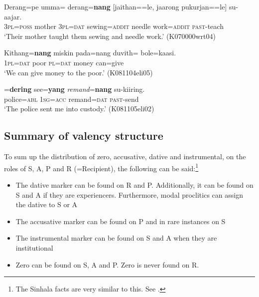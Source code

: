 \ea \label{ex:argstr:3:zzd:jaithan}
\gll Derang=pe umma=\zero{}   derang=\textbf{nang}  [jaithan=\zero=le,  jaarong  pukurjan=\zero=le]      su-aajar. \\
     3\textsc{pl}=\textsc{poss}  mother 3\textsc{pl}=\textsc{dat} sewing=\textsc{addit} needle work=\textsc{addit} \textsc{past}-teach \\
    `Their mother taught them sewing and needle work.' (K070000wrt04)
\z




\ea \label{ex:pred:argstr:3:ddz}
\gll Kithang=\textbf{nang} miskin pada=nang duvith={\zero} bole=kaasi. \\
     1\textsc{pl}=\textsc{dat} poor \textsc{pl}=\textsc{dat} money can=give  \\
    `We can give money to the poor.' (K081104eli05)
\z



\ea \label{ex:argstr:3:instr}
=\textbf{dering} see=\textbf{yang} {\em remand}=\textbf{nang} su-kiiring. \\
     police=\textsc{abl} 1\textsc{sg}=\textsc{acc} remand=\textsc{dat} \textsc{past}-send  \\
    `The police sent me into custody.' (K081105eli02)
\z



\subsection{Summary of valency structure}\label{sec:argstr:Summaryofargumentrstructure}
To sum up the distribution of zero, accusative, dative and instrumental, on the roles of S, A, P and R (=Recipient), the following can be said:\footnote{The Sinhala facts are very similar to this. See \citet{Gair1976sinhalasubject,Gair1991infl,Henadeerage2002}.}

\begin{itemize}
 \item The dative marker can be found on R and P. Additionally, it can be found on S and A if they are experiencers. Furthermore, modal proclitics can assign the dative to S or A
 \item The accusative marker can be found on P and in rare instances on S
 \item The instrumental marker can be found on S and A when they are institutional
 \item Zero can be found on S, A and P. Zero is never found on R.
\end{itemize}

